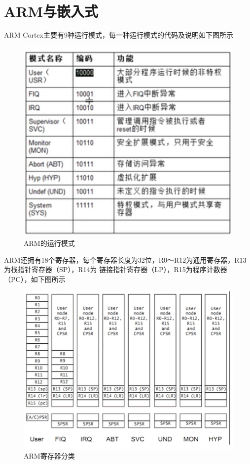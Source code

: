 \chapter{ARM与嵌入式}

ARM Cortex主要有9种运行模式，每一种运行模式的代码及说明如下图所示
\begin{figure}[H]
  \centering
  \includegraphics[scale=0.8]{arm_models.png}
  \caption{ARM的运行模式}
  \label{fig:arm_arch}
\end{figure}

ARM还拥有18个寄存器，每个寄存器长度为32位，R0～R12为通用寄存器，R13为栈指针寄存器（SP），R14为
链接指针寄存器（LP），R15为程序计数器（PC），如下图所示
\begin{figure}[H]
  \centering
  \includegraphics[scale=0.6]{arm_reg.png}
  \caption{ARM寄存器分类}
  \label{fig:arm_reg}
\end{figure}

